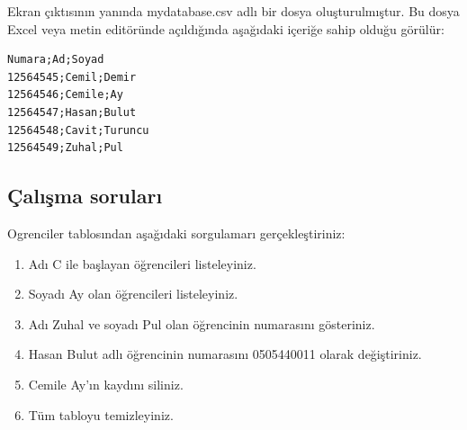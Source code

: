 \documentclass[12pt]{report}
\begin{document}
Ekran çıktısının yanında mydatabase.csv adlı bir dosya oluşturulmıştur. Bu dosya Excel veya metin editöründe açıldığında aşağıdaki içeriğe sahip olduğu görülür:


\begin{verbatim}
Numara;Ad;Soyad
12564545;Cemil;Demir
12564546;Cemile;Ay
12564547;Hasan;Bulut
12564548;Cavit;Turuncu
12564549;Zuhal;Pul
\end{verbatim}


\subsection{Çalışma soruları}
Ogrenciler tablosından aşağıdaki sorgulamarı gerçekleştiriniz:

\begin{enumerate}
	\item Adı C ile başlayan öğrencileri listeleyiniz.
	\item Soyadı Ay olan öğrencileri listeleyiniz.
	\item Adı Zuhal ve soyadı Pul olan öğrencinin numarasını gösteriniz.
	\item Hasan Bulut adlı öğrencinin numarasını 0505440011 olarak değiştiriniz.
	\item Cemile Ay'ın kaydını siliniz.
	\item Tüm tabloyu temizleyiniz.
\end{enumerate}
	
\end{document}

